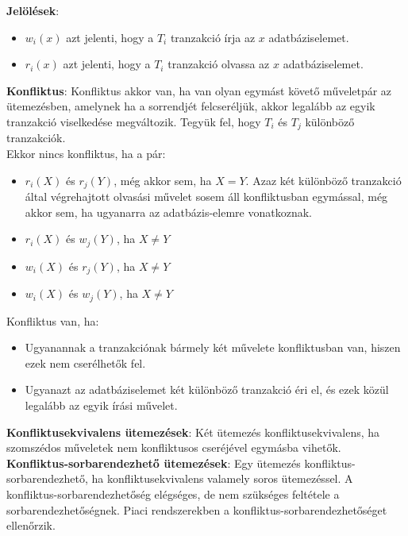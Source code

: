 \documentclass[12pt,margin=0px]{article}
\begin{document}
	\noindent \textbf{Jelölések}:
	\begin{itemize}
		\item	$w_{i}(x)$ azt jelenti, hogy a $T_{i}$ tranzakció írja az $x$ adatbáziselemet.
		\item	$r_{i}(x)$ azt jelenti, hogy a $T_{i}$ tranzakció olvassa az $x$ adatbáziselemet.
	\end{itemize}
\newpage
    \noindent \textbf{Konfliktus}: Konfliktus akkor van, ha van olyan egymást követő műveletpár az ütemezésben, amelynek ha a sorrendjét felcseréljük, akkor legalább az egyik tranzakció viselkedése megváltozik. Tegyük fel, hogy $T_{i}$ és $T_{j}$ különböző tranzakciók.\\
	Ekkor nincs konfliktus, ha a pár:
	\begin{itemize}
		\item	 $r_{i}(X)$ és $r_{j}(Y)$, még akkor sem, ha $X = Y$. Azaz két különböző tranzakció által végrehajtott olvasási művelet
		sosem áll konfliktusban egymással, még akkor sem, ha ugyanarra az adatbázis-elemre vonatkoznak.
		
		\item	$r_{i}(X)$ és   $w_{j}(Y)$, ha $X \not = Y$
		
		\item	$w_{i}(X)$ és   $r_{j}(Y)$, ha $X \not = Y$
		
		\item	$w_{i}(X)$ és   $w_{j}(Y)$, ha $X \not = Y$
	\end{itemize}

	\noindent Konfliktus van, ha:
	\begin{itemize}
		\item Ugyanannak a tranzakciónak bármely két művelete konfliktusban van, hiszen ezek nem cserélhetők fel.
		\item Ugyanazt az adatbáziselemet két különböző tranzakció éri el, és ezek közül legalább az egyik írási művelet.
	\end{itemize}
	
	\noindent \textbf{Konfliktusekvivalens ütemezések}: Két ütemezés konfliktusekvivalens, ha szomszédos műveletek nem konfliktusos
	cseréjével egymásba vihetők.\\
	
	\noindent \textbf{Konfliktus-sorbarendezhető ütemezések}: Egy ütemezés konfliktus-sorbarendezhető, ha konfliktusekvivalens valamely
	soros ütemezéssel. A konfliktus-sorbarendezhetőség elégséges, de nem szükséges feltétele a sorbarendezhetőségnek. Piaci rendszerekben
	a konfliktus-sorbarendezhetőséget ellenőrzik.\\
	
\end{document}
